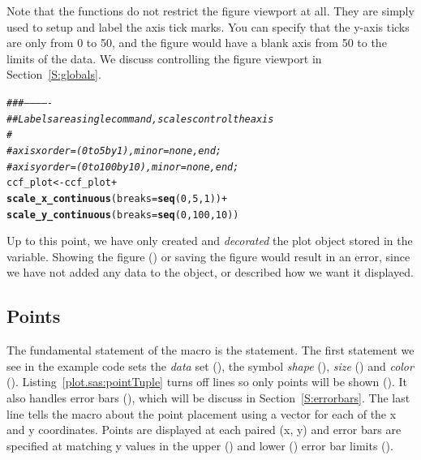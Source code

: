 \documentclass[nojss]{jss}\usepackage[]{graphicx}\usepackage[]{color}
\makeatletter
\newcommand{\hlnum}[1]{\textcolor[rgb]{0.686,0.059,0.569}{#1}}%
\newcommand{\hlcom}[1]{\textcolor[rgb]{0.678,0.584,0.686}{\textit{#1}}}%
\newcommand{\hlopt}[1]{\textcolor[rgb]{0,0,0}{#1}}%
\newcommand{\hlstd}[1]{\textcolor[rgb]{0.345,0.345,0.345}{#1}}%
\newcommand{\hlkwb}[1]{\textcolor[rgb]{0.69,0.353,0.396}{#1}}%
\newcommand{\hlkwc}[1]{\textcolor[rgb]{0.333,0.667,0.333}{#1}}%
\newcommand{\hlkwd}[1]{\textcolor[rgb]{0.737,0.353,0.396}{\textbf{#1}}}%
\newenvironment{kframe}{%
 \def\at@end@of@kframe{}%
 \ifinner\ifhmode%
  \def\at@end@of@kframe{\end{minipage}}%
  \begin{minipage}{\columnwidth}%
 \fi\fi%
 \def\FrameCommand##1{\hskip\@totalleftmargin \hskip-\fboxsep
 \colorbox{shadecolor}{##1}\hskip-\fboxsep
     \hskip-\linewidth \hskip-\@totalleftmargin \hskip\columnwidth}%
 \MakeFramed {\advance\hsize-\width
   \@totalleftmargin\z@ \linewidth\hsize
   \@setminipage}}%
 {\par\unskip\endMakeFramed%
 \at@end@of@kframe}
\newenvironment{knitrout}{}{} %
\makeatother
\begin{document}
Note that the  functions do not restrict the figure viewport at all. They are simply used to setup and label the axis tick marks. You can specify that the y-axis ticks are only from 0 to 50, and the figure would have a blank axis from 50 to the limits of the data. We discuss controlling the figure viewport in Section~\ref{S:globals}.

\begin{knitrout}\footnotesize
{}\color{fgcolor}\begin{kframe}
\begin{alltt}
\hlcom{###-------------}
\hlcom{## Labels are a single command, scales control the axis}
\hlcom{#}
\hlcom{#      axisx order=(0 to 5 by 1), minor=none, end;}
\hlcom{#      axisy order=(0 to 100 by 10), minor=none, end;}
\hlstd{ccf_plot} \hlkwb{<-} \hlstd{ccf_plot} \hlopt{+}
  \hlkwd{scale_x_continuous}\hlstd{(}\hlkwc{breaks}\hlstd{=}\hlkwd{seq}\hlstd{(}\hlnum{0}\hlstd{,}\hlnum{5}\hlstd{,}\hlnum{1}\hlstd{))}\hlopt{+}
  \hlkwd{scale_y_continuous}\hlstd{(}\hlkwc{breaks}\hlstd{=}\hlkwd{seq}\hlstd{(}\hlnum{0}\hlstd{,}\hlnum{100}\hlstd{,}\hlnum{10}\hlstd{))}
\end{alltt}
\end{kframe}
\end{knitrout}

Up to this point, we have only created and \emph{decorated} the plot object stored in the  variable. Showing the figure () or saving the figure would result in an error, since we have not added any data to the object, or described how we want it displayed. 

\subsection{Points}\label{S:points}

The fundamental statement of the  macro is the  statement. The first  statement we see in the example code sets the \emph{data} set (), the symbol \emph{shape} (), \emph{size} () and \emph{color} (). Listing~\ref{plot.sas:pointTuple} turns off lines so only points will be shown (). It also handles error bars (), which will be discuss in Section~\ref{S:errorbars}. The last line tells the macro about the point placement using a vector for each of the x and y coordinates.  Points are displayed at each paired (x, y) and error bars are specified at matching y values in the upper () and lower () error bar limits (). 
\end{document}
